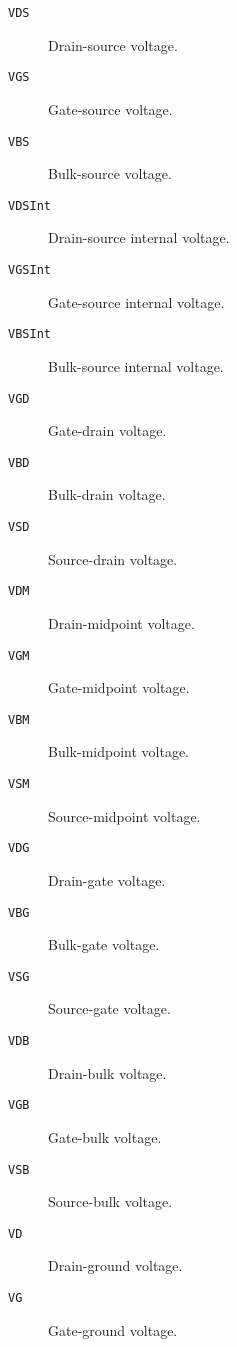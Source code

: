 \begin{description}

\item[{\tt VDS}] Drain-source voltage.

\item[{\tt VGS}] Gate-source voltage.

\item[{\tt VBS}] Bulk-source voltage.

\item[{\tt VDSInt}] Drain-source internal voltage.

\item[{\tt VGSInt}] Gate-source internal voltage.

\item[{\tt VBSInt}] Bulk-source internal voltage.

\item[{\tt VGD}] Gate-drain voltage.

\item[{\tt VBD}] Bulk-drain voltage.

\item[{\tt VSD}] Source-drain voltage.

\item[{\tt VDM}] Drain-midpoint voltage.

\item[{\tt VGM}] Gate-midpoint voltage.

\item[{\tt VBM}] Bulk-midpoint voltage.

\item[{\tt VSM}] Source-midpoint voltage.

\item[{\tt VDG}] Drain-gate voltage.

\item[{\tt VBG}] Bulk-gate voltage.

\item[{\tt VSG}] Source-gate voltage.

\item[{\tt VDB}] Drain-bulk voltage.

\item[{\tt VGB}] Gate-bulk voltage.

\item[{\tt VSB}] Source-bulk voltage.

\item[{\tt VD}] Drain-ground voltage.

\item[{\tt VG}] Gate-ground voltage.


\end{description}
